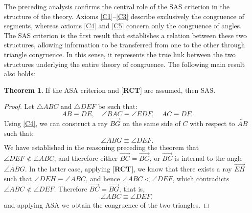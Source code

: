 \documentclass[11pt,a4paper]{article}
\theoremstyle{definition}
\newtheorem{thm}{Theorem}[section]
\theoremstyle{remark}
\numberwithin{equation}{section}
\begin{document}
The preceding analysis confirms the central role of the SAS criterion in the structure of the theory. Axioms \ref{C1}--\ref{C3} describe exclusively the congruence of segments, whereas axioms \ref{C4} and \ref{C5} concern only the congruence of angles. The SAS criterion is the first result that establishes a relation between these two structures, allowing information to be transferred from one to the other through triangle congruence. In this sense, it represents the true link between the two structures underlying the entire theory of congruence. The following main result also holds:
\begin{thm}\label{PEN_ASA}
If the ASA criterion and [\textbf{RCT}] are assumed, then SAS.
\end{thm}
\begin{proof}
Let $\triangle ABC$ and $\triangle DEF$ be such that:
\begin{equation*}
AB\equiv DE,\quad \angle BAC\equiv \angle EDF,\quad AC\equiv DF.
\end{equation*}
Using \ref{C4}, we can construct a ray $\overrightarrow{BG}$ on the same side of $C$ with respect to $\overleftrightarrow{AB}$ such that:
\begin{equation*}
\angle ABG\equiv\angle DEF.
\end{equation*}
We have established in the reasoning preceding the theorem that $\angle DEF\nless\angle ABC$, and therefore either $\overrightarrow{BC}=\overrightarrow{BG}$, or $\overrightarrow{BC}$ is internal to the angle $\angle ABG$. In the latter case, applying [\textbf{RCT}], we know that there exists a ray $\overrightarrow{EH}$ such that $\angle DEH\equiv\angle ABC$, and hence $\angle ABC<\angle DEF$, which contradicts $\angle ABC\nless\angle DEF$. Therefore $\overrightarrow{BC}=\overrightarrow{BG}$, that is,
\begin{equation*}
\angle ABC\equiv\angle DEF,
\end{equation*}
and applying ASA we obtain the congruence of the two triangles.
\end{proof}
\end{document}
